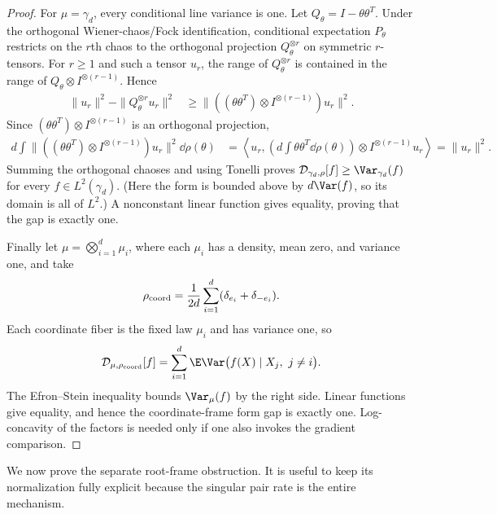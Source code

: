 \documentclass[../main.tex]{subfiles}
\begin{document}
\begin{proof}
For $\mu=\gamma_d$, every conditional line variance is one.  Let
$Q_\theta=I-\theta\theta^T$.  Under the orthogonal Wiener-chaos/Fock identification, conditional
expectation $P_\theta$ restricts on the $r$th chaos to the orthogonal projection
$Q_\theta^{\otimes r}$ on symmetric $r$-tensors.  For $r\ge1$ and such a tensor $u_r$, the range
of $Q_\theta^{\otimes r}$ is contained in the range of
$Q_\theta\otimes I^{\otimes(r-1)}$.  Hence
\begin{align}
 \|u_r\|^2-\|Q_\theta^{\otimes r}u_r\|^2
 &\ge
 \|((\theta\theta^T)\otimes I^{\otimes(r-1)})u_r\|^2.
 \label{eq:sol-fiber-gaussian-one-leg}
\end{align}
Since $(\theta\theta^T)\otimes I^{\otimes(r-1)}$ is an orthogonal projection,
\begin{align}
 d\int\|((\theta\theta^T)\otimes I^{\otimes(r-1)})u_r\|^2\dd\rho(\theta)
 &=\left\langle u_r,
 \left(d\int\theta\theta^T\dd\rho(\theta)\right)
 \otimes I^{\otimes(r-1)}u_r\right\rangle
 =\|u_r\|^2.
 \label{eq:sol-fiber-gaussian-frame-average}
\end{align}
Summing the orthogonal chaoses and using Tonelli proves
$\mathcal D_{\gamma_d,\rho}[f]\ge\Var_{\gamma_d}(f)$ for every $f\in L^2(\gamma_d)$.
(Here the form is bounded above by $d\Var(f)$, so its domain is all of $L^2$.)  A nonconstant
linear function gives equality, proving that the gap is exactly one.

Finally let $\mu=\bigotimes_{i=1}^d\mu_i$, where each $\mu_i$ has a density, mean zero, and
variance one, and take
\begin{equation}
  \rho_{\rm coord}=\frac1{2d}\sum_{i=1}^d(\delta_{e_i}+\delta_{-e_i}).
\end{equation}
Each coordinate fiber is the fixed law $\mu_i$ and has variance one, so
\begin{equation}
 \mathcal D_{\mu,\rho_{\rm coord}}[f]
 =\sum_{i=1}^d\E\Var\bigl(f(X)\mid X_j,\ j\ne i\bigr).
 \label{eq:sol-fiber-product-form}
\end{equation}
The Efron--Stein inequality bounds $\Var_\mu(f)$ by the right side.  Linear functions give
equality, and hence the coordinate-frame form gap is exactly one.  Log-concavity of the factors
is needed only if one also invokes the gradient comparison.
\end{proof}

We now prove the separate root-frame obstruction.  It is useful to keep its normalization fully
explicit because the singular pair rate is the entire mechanism.
\end{document}
